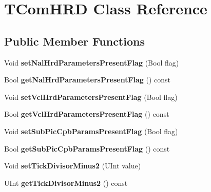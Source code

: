 \hypertarget{class_t_com_h_r_d}{}\section{T\+Com\+H\+RD Class Reference}
\label{class_t_com_h_r_d}
\subsection*{Public Member Functions}
\begin{DoxyCompactItemize}
\item 
\mbox{\label{class_t_com_h_r_d_a446e83545fac92aeca9f00b9b97ead5f}} 
Void {\bfseries set\+Nal\+Hrd\+Parameters\+Present\+Flag} (Bool flag)
\item 
\mbox{\label{class_t_com_h_r_d_ada766cc0224ff8f95940a6de4bcba31d}} 
Bool {\bfseries get\+Nal\+Hrd\+Parameters\+Present\+Flag} () const
\item 
\mbox{\label{class_t_com_h_r_d_a03072e562f20b97a13e860fb35f7f3b6}} 
Void {\bfseries set\+Vcl\+Hrd\+Parameters\+Present\+Flag} (Bool flag)
\item 
\mbox{\label{class_t_com_h_r_d_a193abeaf60c51986a53511dec72ba72e}} 
Bool {\bfseries get\+Vcl\+Hrd\+Parameters\+Present\+Flag} () const
\item 
\mbox{\label{class_t_com_h_r_d_ad17a37eda16ef21b9ce33d4c8499db74}} 
Void {\bfseries set\+Sub\+Pic\+Cpb\+Params\+Present\+Flag} (Bool flag)
\item 
\mbox{\label{class_t_com_h_r_d_a1fe69cb39368135d877f8ab36f68bea7}} 
Bool {\bfseries get\+Sub\+Pic\+Cpb\+Params\+Present\+Flag} () const
\item 
\mbox{\label{class_t_com_h_r_d_ad3442a0184000b8effd03d8d6f0c700f}} 
Void {\bfseries set\+Tick\+Divisor\+Minus2} (U\+Int value)
\item 
\mbox{\label{class_t_com_h_r_d_ad3fbc8c9f4053de264c8dfc27f3f2e8d}} 
U\+Int {\bfseries get\+Tick\+Divisor\+Minus2} () const
\item 
\mbox{\label{class_t_com_h_r_d_a9c38522b056fda7afbaa1b9d67c84cd8}} 

\end{DoxyCompactItemize}
